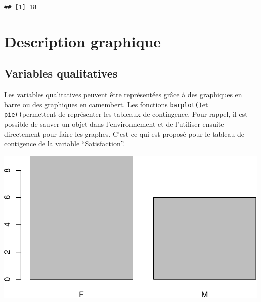\documentclass[
]{book}
\newenvironment{Shaded}{\begin{snugshade}}{\end{snugshade}}
\newcommand{\FunctionTok}[1]{\textcolor[rgb]{0.13,0.29,0.53}{\textbf{#1}}}
\newcommand{\NormalTok}[1]{#1}
\newcommand{\OtherTok}[1]{\textcolor[rgb]{0.56,0.35,0.01}{#1}}
\newcommand{\SpecialCharTok}[1]{\textcolor[rgb]{0.81,0.36,0.00}{\textbf{#1}}}
\begin{document}
\begin{verbatim}
## [1] 18
\end{verbatim}

\section{Description graphique}\label{description-graphique}

\subsection{Variables qualitatives}\label{variables-qualitatives-1}

Les variables qualitatives peuvent être représentées grâce à des graphiques en barre ou des graphiques en camembert. Les fonctions \texttt{barplot()}et \texttt{pie()}permettent de représenter les tableaux de contingence. Pour rappel, il est possible de sauver un objet dans l'environnement et de l'utiliser ensuite directement pour faire les graphes. C'est ce qui est proposé pour le tableau de contigence de la variable ``Satisfaction''.

\begin{Shaded}
\end{Shaded}

\includegraphics{_main_files/figure-latex/unnamed-chunk-53-1.pdf}

\begin{Shaded}
\end{Shaded}
\end{document}
